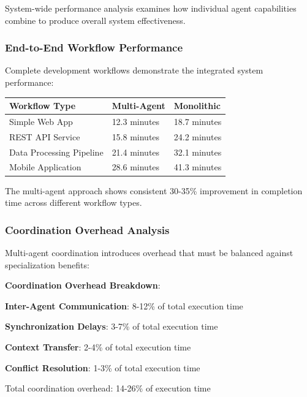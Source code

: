 System-wide performance analysis examines how individual agent capabilities combine to produce overall system effectiveness.

\subsubsection*{End-to-End Workflow Performance}

Complete development workflows demonstrate the integrated system performance:

\begin{center}
\begin{tabular}{@{}lll@{}}
\toprule
\textbf{Workflow Type} & \textbf{Multi-Agent} & \textbf{Monolithic} \\
\midrule
Simple Web App & 12.3 minutes & 18.7 minutes \\
REST API Service & 15.8 minutes & 24.2 minutes \\
Data Processing Pipeline & 21.4 minutes & 32.1 minutes \\
Mobile Application & 28.6 minutes & 41.3 minutes \\
\bottomrule
\end{tabular}
\end{center}

The multi-agent approach shows consistent 30-35\% improvement in completion time across different workflow types.

\subsubsection*{Coordination Overhead Analysis}

Multi-agent coordination introduces overhead that must be balanced against specialization benefits:

\begin{alertbox}
\textbf{Coordination Overhead Breakdown}:
\begin{compactlist}
    \item \textbf{Inter-Agent Communication}: 8-12\% of total execution time
    \item \textbf{Synchronization Delays}: 3-7\% of total execution time
    \item \textbf{Context Transfer}: 2-4\% of total execution time
    \item \textbf{Conflict Resolution}: 1-3\% of total execution time
\end{compactlist}
Total coordination overhead: 14-26\% of execution time
\end{alertbox}

